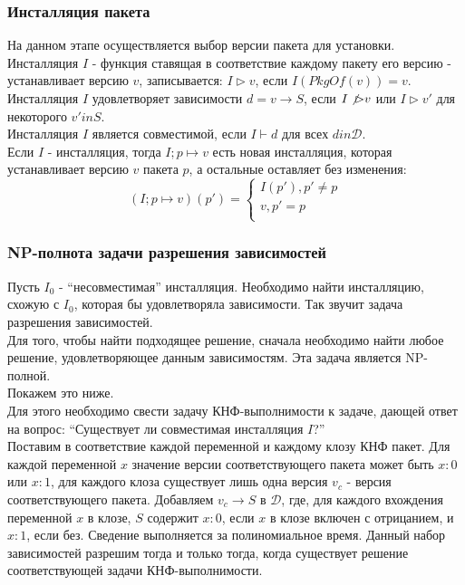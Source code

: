 \subsubsection{Инсталляция пакета}
На данном этапе осуществляется выбор  версии пакета для установки. \\

Инсталляция $I$ - функция ставящая в соответствие каждому пакету его версию -
 устанавливает версию $v$, записывается: $I \rhd v$, если $I(PkgOf(v)) = v$.\\
 
Инсталляция $I$ удовлетворяет зависимости $d = v \to S$, если $I \not\rhd v$
или $I \rhd v'$ для некоторого $v' in S$.\\

Инсталляция $I$ является совместимой, если $I \vdash d$ для всех $d in \mathcal{D}$.\\

Если $I$ - инсталляция, тогда $I;p \mapsto v$ есть новая инсталляция, которая устанавливает 
версию $v$ пакета $p$, а остальные оставляет без изменения:\\

$$ (I;p \mapsto v)(p') = \left\{
\begin{aligned}
I(p'), p' \neq p\\
v,     p' = p\\
\end{aligned}
\right.$$

\subsubsection{NP-полнота задачи разрешения зависимостей}
Пусть $I_0$ - ``несовместимая'' инсталляция. Необходимо найти инсталляцию,
схожую с $I_0$, которая бы удовлетворяла зависимости. Так звучит
задача разрешения зависимостей.\\

Для того, чтобы найти подходящее решение, сначала необходимо найти любое
решение, удовлетворяющее данным зависимостям. Эта задача является NP-полной.\\
Покажем это ниже.\\
Для этого необходимо свести задачу КНФ-выполнимости к задаче, дающей ответ на 
вопрос: ``Существует ли совместимая инсталляция $I$?''\\
Поставим в соответствие каждой переменной и каждому клозу КНФ пакет. Для
каждой переменной $x$ значение версии соответствующего пакета может быть
$x:0$ или $x:1$, для каждого клоза существует лишь одна версия $v_c$ - 
версия соответствующего пакета. Добавляем $v_c \to S$ в $\mathcal{D}$, где,
для каждого вхождения переменной $x$ в клозе, $S$ содержит $x:0$, если
$x$ в клозе включен с отрицанием, и $x:1$, если без. Сведение выполняется за
полиномиальное время. Данный набор зависимостей разрешим тогда и только тогда,
когда существует решение соответствующей задачи КНФ-выполнимости.\\

